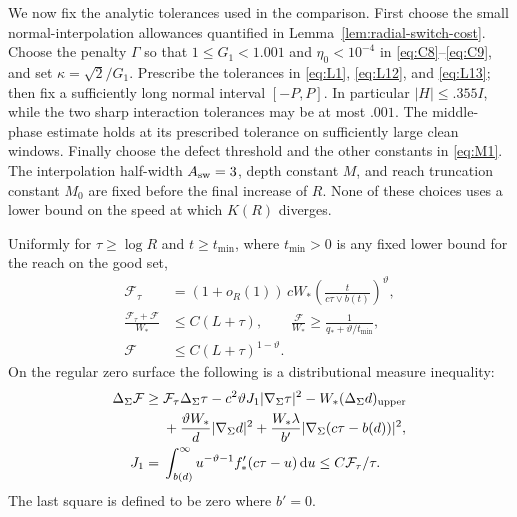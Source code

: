 We now fix the analytic tolerances used in the comparison. First choose
the small normal-interpolation allowances quantified in
Lemma~\ref{lem:radial-switch-cost}. Choose the penalty $\Gamma$ so that
$1\le G_1<1.001$ and $\eta_0<10^{-4}$ in
\eqref{eq:C8}--\eqref{eq:C9}, and set $\kappa=\sqrt2/G_1$.
Prescribe the tolerances in \eqref{eq:L1}, \eqref{eq:L12}, and
\eqref{eq:L13}; then fix a sufficiently long normal interval $[-P,P]$.
In particular $|H|\le.355I$, while the two sharp interaction tolerances
may be at most $.001$. The middle-phase estimate holds at its prescribed
tolerance on sufficiently large clean windows. Finally choose the defect
threshold and the other constants in \eqref{eq:M1}. The interpolation
half-width $A_{\rm sw}=3$, depth constant $M$, and reach truncation constant
$M_0$ are fixed before the final increase of $R$. None of these choices
uses a lower bound on the speed at which $K(R)$ diverges.

\begin{lemma}\label{lem:radial-weight}
Uniformly for $\tau\ge\log R$ and $t\ge t_{\min}$, where $t_{\min}>0$ is
any fixed lower bound for the reach on the good set,
\begin{equation}\label{eq:R1}
\begin{split}
 \mathcal F_\tau
 &=(1+o_R(1))\,cW_*
       \left(\frac{t}{c\tau\vee b(t)}\right)^\vartheta,\\
 \frac{\mathcal F_\tau+\mathcal F}{W_*}&\le C(L+\tau),\qquad
 \frac{\mathcal F}{W_*}\ge\frac1{q_*+\vartheta/t_{\min}},\\
 \mathcal F&\le C(L+\tau)^{1-\vartheta}.
\end{split}
\end{equation}
On the regular zero surface the following is a distributional measure
inequality:
\begin{equation}\label{eq:R2}
\begin{split}
 \Delta_\Sigma\mathcal F\ge{}&
 \mathcal F_\tau\Delta_\Sigma\tau
 -c^2\vartheta J_1|\nabla_\Sigma\tau|^2
 -W_*(\Delta_\Sigma d)_{\rm upper}\\
 &+\frac{\vartheta W_*}{d}|\nabla_\Sigma d|^2
 +\frac{W_*\lambda}{b'}|\nabla_\Sigma(c\tau-b(d))|^2,\\
 J_1={}&\int_{b(d)}^\infty
 u^{-\vartheta-1}f_*'(c\tau-u)\,\mathrm d u
 \le C\mathcal F_\tau/\tau.
\end{split}
\end{equation}
The last square is defined to be zero where $b'=0$.
\end{lemma}

